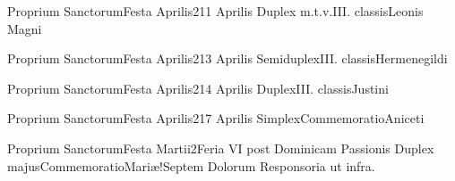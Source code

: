 \documentclass[liber-responsorialis_hiemalis.tex]{subfiles}
\begin{document}
	{Proprium Sanctorum}{Festa Aprilis}{2}{11 Aprilis}
	{Duplex m.t.v.}{III. classis}{Leonis Magni}
	{\copodorubric}
	{\respdetemp}

	{Proprium Sanctorum}{Festa Aprilis}{2}{13 Aprilis}
	{Semiduplex}{III. classis}{Hermenegildi}
	{\umexrubric}
	{\respdetemp}

	{Proprium Sanctorum}{Festa Aprilis}{2}{14 Aprilis}
	{Duplex}{III. classis}{Justini}
	{\umexrubric}
	{\respdetemp}

	{Proprium Sanctorum}{Festa Aprilis}{2}{17 Aprilis}
	{Simplex}{Commemoratio}{Aniceti}
	{\respdetemp}
	{\respdetemp}

	{Proprium Sanctorum}{Festa Martii}{2}{Feria VI post Dominicam Passionis}
	{Duplex majus}{Commemoratio}{Mariæ!Septem Dolorum}
	{Responsoria ut infra.}
	{\respdetemp}
\end{document}
